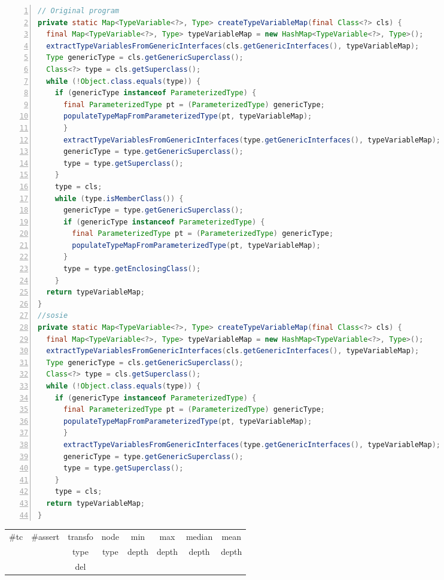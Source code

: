 \begin{minipage}{\columnwidth}
\begin{lstlisting}[caption={\texttt{createTypeVariableMap and a sosie} in EasyMock},language=java,numbers=left]
// Original program
private static Map<TypeVariable<?>, Type> createTypeVariableMap(final Class<?> cls) {
  final Map<TypeVariable<?>, Type> typeVariableMap = new HashMap<TypeVariable<?>, Type>();
  extractTypeVariablesFromGenericInterfaces(cls.getGenericInterfaces(), typeVariableMap);
  Type genericType = cls.getGenericSuperclass();
  Class<?> type = cls.getSuperclass();
  while (!Object.class.equals(type)) {
    if (genericType instanceof ParameterizedType) {
      final ParameterizedType pt = (ParameterizedType) genericType;
      populateTypeMapFromParameterizedType(pt, typeVariableMap);
      }
      extractTypeVariablesFromGenericInterfaces(type.getGenericInterfaces(), typeVariableMap);
      genericType = type.getGenericSuperclass();
      type = type.getSuperclass();
    }
    type = cls;
    while (type.isMemberClass()) {
      genericType = type.getGenericSuperclass();
      if (genericType instanceof ParameterizedType) {
        final ParameterizedType pt = (ParameterizedType) genericType;
        populateTypeMapFromParameterizedType(pt, typeVariableMap);
      }
      type = type.getEnclosingClass();
    }                 
  return typeVariableMap;
}
//sosie
private static Map<TypeVariable<?>, Type> createTypeVariableMap(final Class<?> cls) {
  final Map<TypeVariable<?>, Type> typeVariableMap = new HashMap<TypeVariable<?>, Type>();
  extractTypeVariablesFromGenericInterfaces(cls.getGenericInterfaces(), typeVariableMap);
  Type genericType = cls.getGenericSuperclass();
  Class<?> type = cls.getSuperclass();
  while (!Object.class.equals(type)) {
    if (genericType instanceof ParameterizedType) {
      final ParameterizedType pt = (ParameterizedType) genericType;
      populateTypeMapFromParameterizedType(pt, typeVariableMap);
      }
      extractTypeVariablesFromGenericInterfaces(type.getGenericInterfaces(), typeVariableMap);
      genericType = type.getGenericSuperclass();
      type = type.getSuperclass();
    }
    type = cls;
  return typeVariableMap;
}
\end{lstlisting}
\tabcolsep=0.11cm
\begin{tabular}{>{\small}c>{\small}c>{\small}c>{\small}c>{\small}c>{\small}c>{\small}c>{\small}c}
\hline
\rowcolor{lightgray} \#tc & \#assert & transfo & node & min & max & median & mean   \\
\rowcolor{lightgray}  & & type & type & depth  & depth & depth & depth  \\ 
\hline
&  & del &  &  &  &  & \\
\hline
\end{tabular}
\end{minipage}
